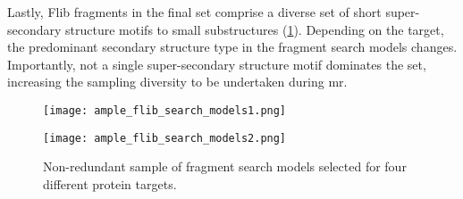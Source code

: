 Lastly, Flib fragments in the final set comprise a diverse set of short super-secondary structure motifs to small substructures (\cref{fig:ample_flib_search_models}). Depending on the target, the predominant secondary structure type in the fragment search models changes. Importantly, not a single super-secondary structure motif dominates the set, increasing the sampling diversity to be undertaken during \gls{mr}.

\begin{figure}[H]
	\centering
	\texttt{[image: ample\_flib\_search\_models1.png]}
\end{figure}

\begin{figure}[H]\ContinuedFloat
	\centering
	\texttt{[image: ample\_flib\_search\_models2.png]}
	\caption[Fragment search models derived from Flib]{Non-redundant sample of fragment search models selected for four different protein targets.}
	\label{fig:ample_flib_search_models}
\end{figure}

